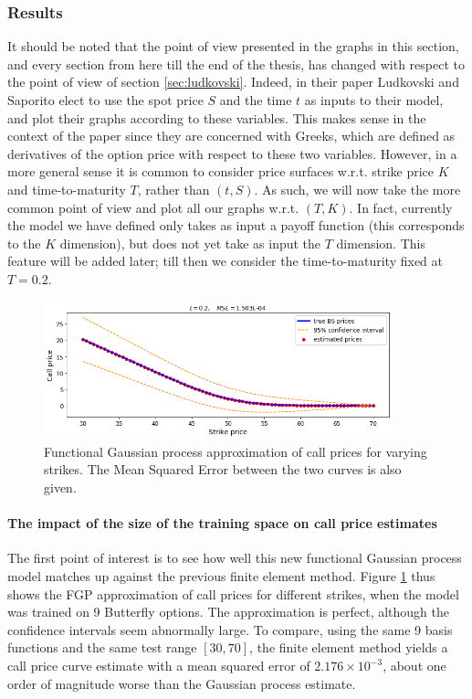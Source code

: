 \documentclass[a4paper,12pt]{article}
\begin{document}
\subsubsection{Results}
It should be noted that the point of view presented in the graphs in this section, and every section from here till the end of the thesis, has changed with respect to the point of view of section \ref{sec:ludkovski}. Indeed, in their paper \cite{Ludkovski2020} Ludkovski and Saporito elect to use the spot price $S$ and the time $t$ as inputs to their model, and plot their graphs according to these variables. This makes sense in the context of the paper since they are concerned with Greeks, which are defined as derivatives of the option price with respect to these two variables. However, in a more general sense it is common to consider price surfaces w.r.t. strike price $K$ and time-to-maturity $T$, rather than $(t, S)$. As such, we will now take the more common point of view and plot all our graphs w.r.t. $(T, K)$. In fact, currently the model we have defined only takes as input a payoff function (this corresponds to the $K$ dimension), but does not yet take as input the $T$ dimension. This feature will be added later; till then we consider the time-to-maturity fixed at $T = 0.2$.
\begin{figure} [H]
    \centering
    \includegraphics[width=0.9\textwidth]{fgp_call_price_approx.png}
    \caption{Functional Gaussian process approximation of call prices for varying strikes. The Mean Squared Error between the two curves is also given.}
    \label{fig:fgp_call_price_approx}
\end{figure}

\paragraph{The impact of the size of the training space on call price estimates}
The first point of interest is to see how well this new functional Gaussian process model matches up against the previous finite element method. Figure \ref{fig:fgp_call_price_approx} thus shows the FGP approximation of call prices for different strikes, when the model was trained on 9 Butterfly options. The approximation is perfect, although the confidence intervals seem abnormally large. To compare, using the same 9 basis functions and the same test range $[30, 70]$, the finite element method yields a call price curve estimate with a mean squared error of $2.176 \times 10^{-3}$, about one order of magnitude worse than the Gaussian process estimate.
\end{document}
